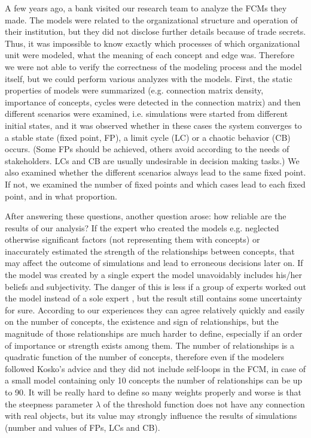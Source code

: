 \documentclass[graybox]{svmult}
\begin{document}
A few years ago, a bank visited our research team to analyze the FCMs 
they made. The models were related to the organizational structure and 
operation of their institution, but they did not disclose further 
details because of trade secrets. Thus, it was impossible to know 
exactly which processes of which organizational unit were modeled, what 
the meaning of each concept and edge was. Therefore we were not able to 
verify the correctness of the modeling process and the model itself, 
but we could perform various analyzes with the models. First, 
the static properties of models were summarized (e.g. connection matrix 
density, importance of concepts, cycles were detected 
in the connection matrix) and then different 
scenarios were examined, i.e. simulations were started from different 
initial states, and it was observed whether in these cases the system 
converges to a stable state (fixed point, FP), a limit cycle (LC) or a 
chaotic behavior (CB) occurs. (Some FPs should be achieved, others 
avoid according to the needs of stakeholders. LCs and CB are usually 
undesirable in decision making tasks.) We also examined whether the 
different scenarios always lead to the same fixed point. If not, we 
examined the number of fixed points and which cases lead to each fixed 
point, and in what proportion.

After answering these questions, another question arose: how reliable 
are the results of our analysis? If the expert who created the models 
e.g. neglected otherwise significant factors (not representing them 
with concepts) or inaccurately estimated the strength of the 
relationships between concepts, that may affect the outcome of 
simulations and lead to erroneous decisions later on. If the model was 
created by a single expert the model unavoidably includes his/her 
beliefs and subjectivity. The danger of this is less if a group of 
experts worked out the model instead of a sole expert 
\cite{kosko1988hidden,groumpos2010fuzzy}, but the result still contains 
some uncertainty for sure. According to our experiences they can agree 
relatively quickly and easily on the number of concepts, the existence 
and sign of relationships, but the magnitude of those relationships are 
much harder to define, especially if an order of importance or strength 
exists among them. The number of relationships is a quadratic function 
of the number of concepts, therefore even if the modelers followed 
Kosko's advice and they did not include self-loops in the FCM, in case 
of a small model containing only 10 concepts the number of 
relationships can be up to 90. It will be really hard to define so many 
weights properly and worse is that the steepness parameter $\lambda$ of 
the threshold function does not have any connection with real objects, 
but its value may strongly influence the results of simulations (number 
and values of FPs, LCs and CB).
\end{document}
